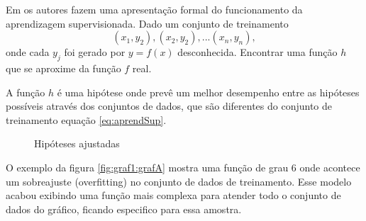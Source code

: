 Em \cite{RusselStuart.Norvig2013} os autores fazem uma apresentação formal do funcionamento da aprendizagem supervisionada. Dado um conjunto de treinamento 
\begin{equation}
 (x_{1},y_{2}),(x_{2},y_{2}),...(x_{n},y_{n}),
 \label{eq:aprendSup}
\end{equation}
onde cada ${y_{j}} $ foi gerado por ${y=f(x)}$ desconhecida. Encontrar uma função ${h}$ que se aproxime da função ${f}$ real.


A função ${h}$ é uma hipótese onde prevê um melhor desempenho entre as hipóteses possíveis através dos conjuntos de dados, que são diferentes do conjunto de treinamento equação \ref{eq:aprendSup}.

 \begin{figure}[h!]
    \centering
    \quad
    
    \caption{Hipóteses ajustadas} \label{fig:graf1}
        
\end{figure}


O exemplo da figura \ref{fig:graf1:grafA} mostra uma função de grau 6 onde acontece  um sobreajuste (overfitting) no conjunto de dados de treinamento. Esse modelo acabou exibindo uma função mais complexa para atender todo o conjunto de dados do gráfico, ficando especifico para essa amostra. 

